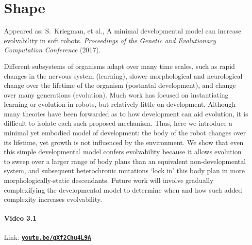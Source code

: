 
\chapter{Shape}

{\footnotesize
\noindent
Appeared as:
S.~Kriegman, et al., A minimal developmental model can increase evolvability in soft robots. \textit{Proceedings of the Genetic and Evolutionary Computation Conference} (2017).
}

\vspace{2em}

\noindent
Different subsystems of organisms adapt over many time scales,
such as rapid changes in the nervous system (learning),
slower morphological and neurological change over the lifetime 
of the organism (postnatal development), and change over
many generations (evolution). Much work has
focused on instantiating learning or evolution in robots, but relatively
little on development. Although many theories have been
forwarded as to how development can aid evolution, it is difficult
to isolate each such proposed mechanism. Thus, here we introduce
a minimal yet embodied model of development: the body of the
robot changes over its lifetime, yet growth is not influenced
by the environment. We show that even this simple developmental
model confers
evolvability because it allows evolution to sweep over a larger
range of body plans than an equivalent non-developmental system,
and subsequent heterochronic mutations
`lock in' this body plan in more morphologically-static descendants.
Future work will involve gradually complexifying the developmental
model to determine when and how such added complexity increases
evolvability.


\subsubsection*{Video 3.1}
Link: \href{https://youtu.be/gXf2Chu4L9A}{\textbf{\texttt{youtu.be/gXf2Chu4L9A}}}


% 

% 

% 

% 